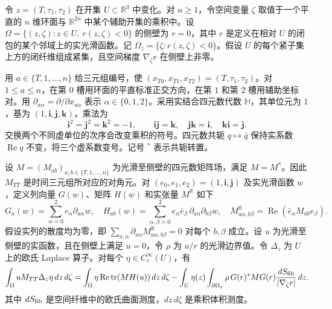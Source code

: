 令 $z=(T,\tau_1,\tau_2)$ 在开集 $U\subset\mathbb R^3$ 中变化。对 $n\ge1$，令空间变量 $\zeta$ 取值于一个平直的 $n$ 维环面与 $\mathbb R^{2n}$ 中某个辅助开集的乘积中。设
$\Omega=\{(z,\zeta):z\in U,\ r(z,\zeta)<0\}$
的侧壁为 $r=0$，其中 $r$ 是定义在相对 $U$ 的闭包的某个邻域上的实光滑函数。记 $\Omega_z=\{\zeta:r(z,\zeta)<0\}$。假设 $U$ 的每个紧子集上方的闭纤维组成紧集，且空间梯度 $\nabla_\zeta r$ 在侧壁上非零。

用 $a\in\{T,1,\ldots,n\}$ 给三元组编号，使 $(x_{T0},x_{T1},x_{T2})=(T,\tau_1,\tau_2)$。对 $1\le a\le n$，在第 $0$ 槽用环面的平直标准正交方向，在第 $1$ 和第 $2$ 槽用辅助坐标对。用 $\partial_{a\alpha}=\partial/\partial x_{a\alpha}$ 表示 $\alpha\in\{0,1,2\}$。采用实结合四元数代数 $\mathbb H$，其单位元为 $1$，基为 $(1,\mathbf i,\mathbf j,\mathbf k)$，乘法为
\[
 \mathbf i^2=\mathbf j^2=\mathbf k^2=-1,\qquad
 \mathbf i\mathbf j=\mathbf k,\quad
 \mathbf j\mathbf k=\mathbf i,\quad
 \mathbf k\mathbf i=\mathbf j .
\]
交换两个不同虚单位的次序会改变乘积的符号。四元数共轭 $q\mapsto\bar q$ 保持实系数 $\operatorname{Re}q$ 不变，将三个虚系数变号。记号 $^*$ 表示共轭转置。

设 $M=(M_{ab})_{a,b\in\{T,1,\ldots,n\}}$ 为光滑至侧壁的四元数矩阵场，满足 $M=M^*$。因此 $M_{TT}$ 是时间三元组所对应的对角元。对 $(e_0,e_1,e_2)=(1,\mathbf i,\mathbf j)$ 及实光滑函数 $w$，定义列向量 $G(w)$、矩阵 $H(w)$ 和实张量 $M^{\mathbb R}$ 如下
\[
G_a(w)=\sum_{\alpha=0}^2e_\alpha\partial_{a\alpha}w,\quad
H_{ab}(w)=\sum_{\alpha,\beta=0}^2e_\alpha\bar e_\beta\,\partial_{a\alpha}\partial_{b\beta}w,\quad
M^\mathbb R_{a\alpha,b\beta}=\operatorname{Re}(\bar e_\alpha M_{ab}e_\beta).
\]
假设实列的散度均为零，即 $\sum_{a,\alpha}\partial_{a\alpha}M^\mathbb R_{a\alpha,b\beta}=0$ 对每个 $b,\beta$ 成立。设 $u$ 为光滑至侧壁的实函数，且在侧壁上满足 $u=0$，令 $\rho$ 为 $u/r$ 的光滑边界值。令 $\Delta_z$ 为 $U$ 上的欧氏 Laplace 算子。对每个 $\eta\in C_c^\infty(U)$，有
\[
 \int_\Omega u M_{TT}\Delta_z\eta\,dz\,d\zeta
 = \int_\Omega \eta\operatorname{Re}\operatorname{tr}(MH(u))\,dz\,d\zeta
 - \int_U \eta(z)\int_{\partial\Omega_z}\rho\,G(r)^*MG(r)
                 \frac{dS_{\rm fib}}{|\nabla_\zeta r|}\,dz .
\]
其中 $dS_{\rm fib}$ 是空间纤维中的欧氏曲面测度，$dz\,d\zeta$ 是乘积体积测度。
